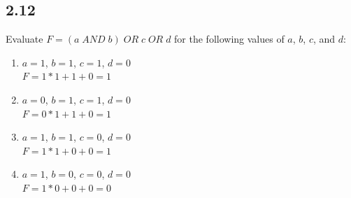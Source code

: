 \documentclass{article}
\begin{document}
\subsection*{2.12}
Evaluate $F = (a \; AND \; b) \; OR \; c \; OR \; d$ for the following values of $a$, $b$, $c$, and $d$:
\begin{enumerate}
    \item $a = 1$, $b = 1$, $c = 1$, $d = 0$ \\
    $ F = 1*1 + 1 + 0 = 1 $
    \item $a = 0$, $b = 1$, $c = 1$, $d = 0$ \\
    $ F = 0*1 + 1 + 0 = 1 $
    \item $a = 1$, $b = 1$, $c = 0$, $d = 0$ \\
    $ F = 1*1 + 0 + 0 = 1 $
    \item $a = 1$, $b = 0$, $c = 0$, $d = 0$ \\
    $ F = 1*0 + 0 + 0 = 0 $
\end{enumerate}
\end{document}

